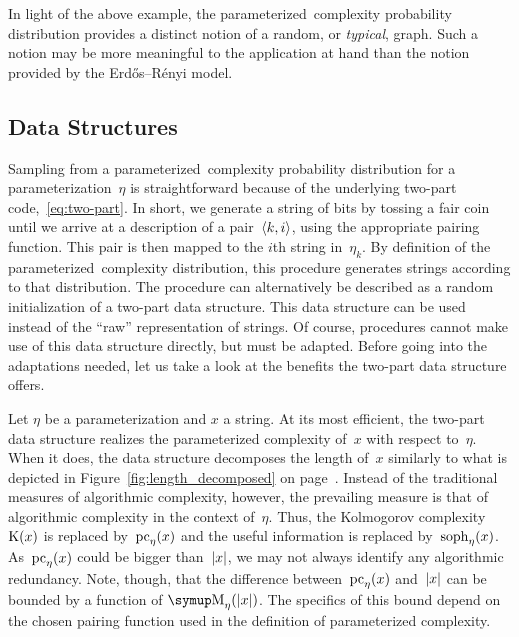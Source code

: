 In light of the above example, the parameterized~complexity probability distribution provides a distinct notion of a random, or \emph{typical}, graph.
Such a notion may be more meaningful to the application at hand than the notion provided by the Erd{\H{o}}s--R{\'e}nyi model.

\subsection{Data Structures}
\label{sec:statistics:data_structures}%
Sampling from a parameterized~complexity probability distribution for a parameterization~$\eta$ is straightforward because of the underlying two-part code,~\eqref{eq:two-part}.
In short, we generate a string of bits by tossing a fair coin until we arrive at a description of a pair~${\langle k, i\rangle}$, using the appropriate pairing function.
This pair is then mapped to the $i$th string in~$\eta_k$.
By definition of the parameterized~complexity distribution, this procedure generates strings according to that distribution.
The procedure can alternatively be described as a random initialization of a two-part data structure.
This data structure can be used instead of the \enquote{raw} representation of strings.
Of course, procedures cannot make use of this data structure directly, but must be adapted.
Before going into the adaptations needed, let us take a look at the benefits the two-part data structure offers.

Let $\eta$ be a parameterization and $x$ a string.
At its most efficient, the two-part data structure realizes the parameterized complexity of~$x$ with respect to~$\eta$.
When it does, the data structure decomposes the length of~$x$ similarly to what is depicted in Figure~\ref{fig:length_decomposed} on page~\pageref{fig:length_decomposed}.
Instead of the traditional measures of algorithmic complexity, however, the prevailing measure is that of algorithmic complexity in the context of~$\eta$.
Thus, the Kolmogorov complexity~$\operatorname{K}(x)$ is replaced by~$\operatorname{pc}_\eta(x)$ and the useful information is replaced by~$\operatorname{soph}_\eta(x)$.
As~$\operatorname{pc}_\eta(x)$ could be bigger than~${\lvert x\rvert}$, we may not always identify any algorithmic redundancy.
Note, though, that the difference between~$\operatorname{pc}_\eta(x)$ and~${\lvert x\rvert}$ can be bounded by a function of $\upM_\eta(\length{x})$.
The specifics of this bound depend on the chosen pairing function used in the definition of parameterized complexity.

